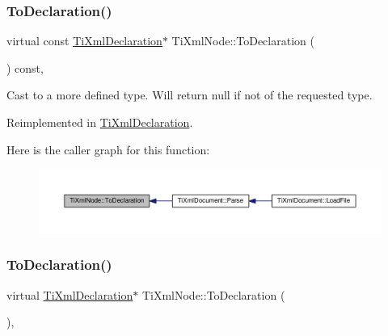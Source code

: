 \subsubsection{\texorpdfstring{To\+Declaration()}{ToDeclaration()}\hspace{0.1cm}{\footnotesize\ttfamily [1/2]}}
{\footnotesize\ttfamily virtual const \hyperlink{class_ti_xml_declaration}{Ti\+Xml\+Declaration}$\ast$ Ti\+Xml\+Node\+::\+To\+Declaration (\begin{DoxyParamCaption}{ }\end{DoxyParamCaption}) const\hspace{0.3cm}{\ttfamily [inline]}, {\ttfamily [virtual]}}



Cast to a more defined type. Will return null if not of the requested type. 



Reimplemented in \hyperlink{class_ti_xml_declaration_aab62703b620d9b9391b482dc1835ecf6}{Ti\+Xml\+Declaration}.

Here is the caller graph for this function\+:
\nopagebreak
\begin{figure}[H]
\begin{center}
\leavevmode
\includegraphics[width=350pt]{class_ti_xml_node_a0dc0831e89d499ca911a3be61a413d45_icgraph}
\end{center}
\end{figure}
\mbox{\label{class_ti_xml_node_a4027136ca820ff4a636b607231b6a6df}} 
\subsubsection{\texorpdfstring{To\+Declaration()}{ToDeclaration()}\hspace{0.1cm}{\footnotesize\ttfamily [2/2]}}
{\footnotesize\ttfamily virtual \hyperlink{class_ti_xml_declaration}{Ti\+Xml\+Declaration}$\ast$ Ti\+Xml\+Node\+::\+To\+Declaration (\begin{DoxyParamCaption}{ }\end{DoxyParamCaption})\hspace{0.3cm}{\ttfamily [inline]}, {\ttfamily [virtual]}}



